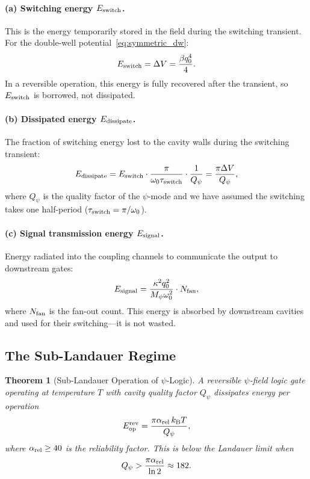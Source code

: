\documentclass[12pt,a4paper,twoside]{article}
\newtheorem{theorem}{Theorem}[section]
\newcommand{\kB}{k_{\mathrm{B}}}
\begin{document}
\paragraph{(a) Switching energy $E_{\rm switch}$.}
This is the energy temporarily stored in the field during the switching transient. For the double-well potential~\eqref{eq:symmetric_dw}:
\begin{equation}
E_{\rm switch} = \Delta V = \frac{\beta q_0^4}{4}.
\end{equation}
In a reversible operation, this energy is fully recovered after the transient, so $E_{\rm switch}$ is borrowed, not dissipated.

\paragraph{(b) Dissipated energy $E_{\rm dissipate}$.}
The fraction of switching energy lost to the cavity walls during the switching transient:
\begin{equation}
E_{\rm dissipate} = E_{\rm switch} \cdot \frac{\pi}{\omega_0 \tau_{\rm switch}} \cdot \frac{1}{Q_\psi} = \frac{\pi \Delta V}{Q_\psi},
\label{eq:dissipation}
\end{equation}
where $Q_\psi$ is the quality factor of the $\psi$-mode and we have assumed the switching takes one half-period ($\tau_{\rm switch} = \pi/\omega_0$).

\paragraph{(c) Signal transmission energy $E_{\rm signal}$.}
Energy radiated into the coupling channels to communicate the output to downstream gates:
\begin{equation}
E_{\rm signal} = \frac{\kappa^2 q_0^2}{M_\psi \omega_0^2} \cdot N_{\rm fan},
\end{equation}
where $N_{\rm fan}$ is the fan-out count. This energy is absorbed by downstream cavities and used for their switching---it is not wasted.

\subsection{The Sub-Landauer Regime}\label{sec:sub_landauer}

\begin{theorem}[Sub-Landauer Operation of $\psi$-Logic]
\label{thm:sub_landauer}
A reversible $\psi$-field logic gate operating at temperature $T$ with cavity quality factor $Q_\psi$ dissipates energy per operation
\begin{equation}
E_{\rm op}^{\rm rev} = \frac{\pi\alpha_{\rm rel}\,\kB T}{Q_\psi},
\label{eq:sub_landauer}
\end{equation}
where $\alpha_{\rm rel} \geq 40$ is the reliability factor. This is below the Landauer limit when
\begin{equation}
Q_\psi > \frac{\pi\alpha_{\rm rel}}{\ln 2} \approx 182.
\label{eq:Q_threshold}
\end{equation}
\end{theorem}
\end{document}
